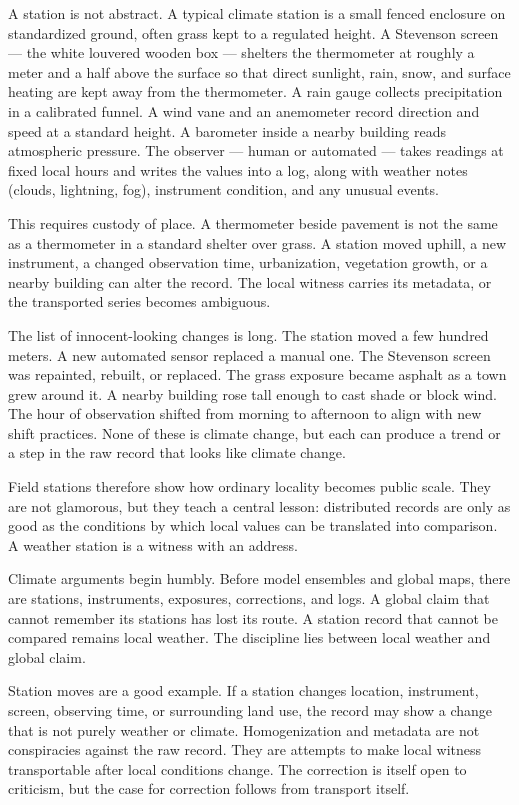 A station is not abstract. A typical climate station is a small fenced
enclosure on standardized ground, often grass kept to a regulated
height. A Stevenson screen --- the white louvered wooden box ---
shelters the thermometer at roughly a meter and a half above the surface
so that direct sunlight, rain, snow, and surface heating are kept away
from the thermometer. A rain
gauge collects precipitation in a calibrated funnel. A wind vane and an
anemometer record direction and speed at a standard height. A barometer
inside a nearby building reads atmospheric pressure. The observer ---
human or automated --- takes readings at fixed local hours and writes
the values into a log, along with weather notes (clouds, lightning,
fog), instrument condition, and any unusual events.

This requires custody of place. A thermometer beside pavement is not the
same as a thermometer in a standard shelter over grass. A station moved
uphill, a new instrument, a changed observation time, urbanization,
vegetation growth, or a nearby building can alter the record. The local
witness carries its metadata, or the transported series becomes
ambiguous.

The list of innocent-looking changes is long. The station moved a few
hundred meters. A new automated sensor replaced a manual one. The
Stevenson screen was repainted, rebuilt, or replaced. The grass exposure
became asphalt as a town grew around it. A nearby building rose tall
enough to cast shade or block wind. The hour of observation shifted from
morning to afternoon to align with new shift practices. None of these is
climate change, but each can produce a trend or a step in the raw record
that looks like climate change.

Field stations therefore show how ordinary locality becomes public scale.
They are not glamorous, but they teach a central lesson: distributed
records are only as good as the conditions by which local values can be
translated into comparison. A weather station is a witness with an
address.

Climate arguments begin humbly. Before model ensembles and global maps,
there are stations, instruments, exposures, corrections, and logs. A
global claim that cannot remember its stations has lost its route. A
station record that cannot be compared remains local weather. The
discipline lies between local weather and global claim.

Station moves are a good example. If a station changes location,
instrument, screen, observing time, or surrounding land use, the record
may show a change that is not purely weather or climate. Homogenization
and metadata are not conspiracies against the raw record. They are
attempts to make local witness transportable after local conditions
change. The correction is itself open to criticism, but the case for
correction follows from transport itself.

